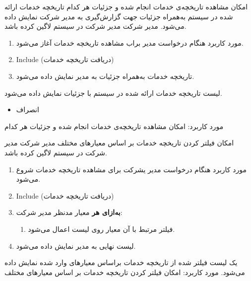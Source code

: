 \usecase
{امکان مشاهده تاریخچه‌‌ی خدمات انجام شده و جزئیات هر کدام}
{}
{تاریخچه خدمات ارائه شده در سیستم به‌همراه جزئیات جهت گزارش‌گیری به مدیر شرکت نمایش داده می‌شود.}
{مدیر شرکت}
{}
{مدیر شرکت در سیستم لاگین کرده باشد.}
{
	\vspace*{-0.6cm}
	\begin{enumerate}
		\item مورد کاربرد هنگام درخواست مدیر براب مشاهده تاریخچه خدمات آغاز می‌شود.
		\item 
		Include (دریافت تاریخچه خدمات)
		\item 
		تاریخچه خدمات به‌همراه جزئیات به مدیر نمایش داده می‌شود.
	\end{enumerate}
}
{لیست تاریخچه خدمات ارائه شده در سیستم با جزئیات نمایش داده می‌شود.}
{
	\begin{itemize}
		\vspace*{-0.6cm}
		\item انصراف
	\end{itemize}
}
{
	مورد کاربرد: امکان مشاهده تاریخچه‌‌ی خدمات انجام شده و جزئیات هر کدام
}


\usecase
{امکان فیلتر کردن تاریخچه خدمات بر اساس معیارهای مختلف}
{}
{}
{مدیر شرکت}
{}
{مدیر شرکت در سیستم لاگین کرده باشد.}
{
	\vspace*{-0.6cm}
	\begin{enumerate}
		\item مورد کاربرد هنگام درخواست مدیر یشرکت برای مشاهده تاریخچه خدمات شروع می‌شود.
		\item 
		Include (دریافت تاریخچه خدمات)
		\item
		\textbf{به‌ازای هر} معیار مدنظر مدیر شرکت:
		\begin{enumerate}[label=\theenumi.\arabic*.]
			\item فیلتر مرتبط با آن معیار روی لیست اعمال می‌شود.
		\end{enumerate}
		\item لیست نهایی به مدیر نمایش داده می‌شود.
	\end{enumerate}
}
{یک لیست فیلتر شده از تاریخچه خدمات براساس معیارهای وارد شده نمایش داده می‌شود.}
{
}
{
	مورد کاربرد: امکان فیلتر کردن تاریخچه خدمات بر اساس معیارهای مختلف
}

